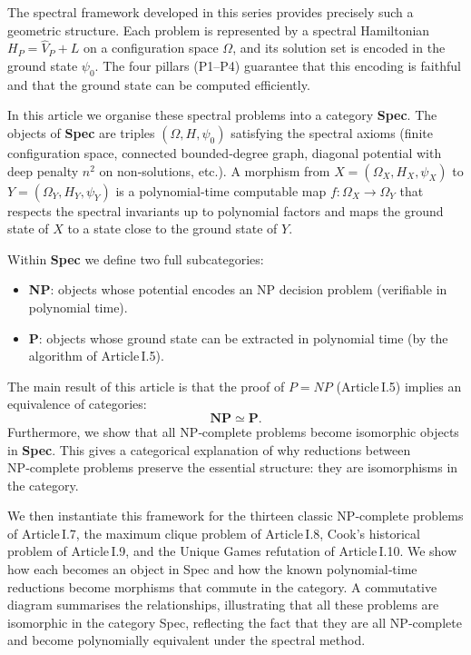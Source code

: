 \documentclass[11pt,a4paper]{article}
\begin{document}
The spectral framework developed in this series provides precisely such a geometric structure. Each problem is represented by a spectral Hamiltonian $H_P = \hat{V}_P + L$ on a configuration space $\Omega$, and its solution set is encoded in the ground state $\psi_0$. The four pillars (P1–P4) guarantee that this encoding is faithful and that the ground state can be computed efficiently.

In this article we organise these spectral problems into a category \textbf{Spec}. The objects of \textbf{Spec} are triples $(\Omega, H, \psi_0)$ satisfying the spectral axioms (finite configuration space, connected bounded‑degree graph, diagonal potential with deep penalty $n^2$ on non‑solutions, etc.). A morphism from $X = (\Omega_X, H_X, \psi_X)$ to $Y = (\Omega_Y, H_Y, \psi_Y)$ is a polynomial‑time computable map $f: \Omega_X \to \Omega_Y$ that respects the spectral invariants up to polynomial factors and maps the ground state of $X$ to a state close to the ground state of $Y$.

Within \textbf{Spec} we define two full subcategories:
\begin{itemize}
\item \textbf{NP}: objects whose potential encodes an NP decision problem (verifiable in polynomial time).
\item \textbf{P}: objects whose ground state can be extracted in polynomial time (by the algorithm of Article I.5).
\end{itemize}

The main result of this article is that the proof of $P = NP$ (Article I.5) implies an equivalence of categories:
\[
\mathbf{NP} \simeq \mathbf{P}.
\]
Furthermore, we show that all NP‑complete problems become isomorphic objects in \textbf{Spec}. This gives a categorical explanation of why reductions between NP‑complete problems preserve the essential structure: they are isomorphisms in the category.

We then instantiate this framework for the thirteen classic NP‑complete problems of Article I.7, the maximum clique problem of Article I.8, Cook's historical problem of Article I.9, and the Unique Games refutation of Article I.10. We show how each becomes an object in Spec and how the known polynomial‑time reductions become morphisms that commute in the category. A commutative diagram summarises the relationships, illustrating that all these problems are isomorphic in the category Spec, reflecting the fact that they are all NP‑complete and become polynomially equivalent under the spectral method.
\end{document}
